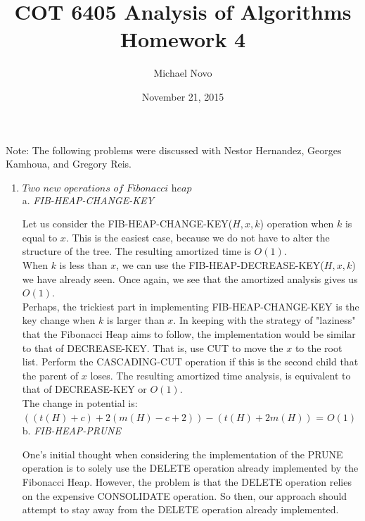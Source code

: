 \documentclass[]{report}
\title{COT 6405 Analysis of Algorithms \\ Homework 4}
\author{Michael Novo}
\date{November 21, 2015}
\begin{document}
\maketitle

Note: The following problems were discussed with Nestor Hernandez, Georges Kamhoua, and Gregory Reis.

\begin{enumerate}
	
	
	
	 \item $ \textit{Two new operations of Fibonacci heap} $ \\
	 
	 a. \textit{FIB-HEAP-CHANGE-KEY } 
	 
	 Let us consider the FIB-HEAP-CHANGE-KEY($ H, x, k $) operation when $ k $ is equal to $ x $. This is the easiest case, because we do not have to alter the structure of the tree. The resulting amortized time is $ O(1) $. \\
	 
	 When $ k $ is less than $x$, we can use the FIB-HEAP-DECREASE-KEY($ H, x, k $) we have already seen. Once again, we see that the amortized analysis gives us  $ O(1) $. \\
	 
	 Perhaps, the trickiest part in implementing FIB-HEAP-CHANGE-KEY is the key change when $ k $ is larger than $ x $. In keeping with the strategy of "laziness" that the Fibonacci Heap aims to follow, the implementation would be similar to that of DECREASE-KEY. That is, use CUT to move the $ x $ to the root list. Perform the CASCADING-CUT operation if this is the second child that the parent of $ x $ loses. The resulting amortized time analysis, is equivalent to that of DECREASE-KEY or $O(1)$. \\	 
	 
	 The change in potential is: \\
	 $ (     (t(H) + c ) + 2(m(H)  - c + 2))  -  (t(H) + 2m(H) )  $ = $  O(1) $ \\
	  
	 b. \textit{FIB-HEAP-PRUNE } 
	 
	 One's initial thought when considering the implementation of the PRUNE operation is to solely use the DELETE operation already implemented by the Fibonacci Heap. However, the problem is that the DELETE operation relies on the expensive CONSOLIDATE operation. So then, our approach should attempt to stay away from the DELETE operation already implemented. \\
	 

\end{enumerate}
\end{document}
